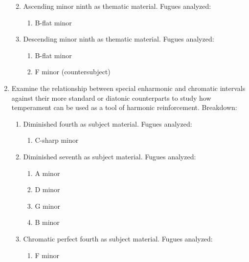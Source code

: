 \begin{enumerate}
  \begin{enumerate}
  \def\labelenumii{\arabic{enumii}.}
  \tightlist
  \item
    Ascending minor ninth as thematic material. Fugues analyzed:

    \begin{enumerate}
    \def\labelenumiii{\arabic{enumiii}.}
    \tightlist
    \item
      B-flat minor
    \end{enumerate}
  \item
    Descending minor ninth as thematic material. Fugues analyzed:

    \begin{enumerate}
    \def\labelenumiii{\arabic{enumiii}.}
    \tightlist
    \item
      B-flat minor
    \item
      F minor (countersubject)
    \end{enumerate}
  \end{enumerate}
\item
  Examine the relationship between special enharmonic and chromatic
  intervals against their more standard or diatonic counterparts to
  study how temperament can be used as a tool of harmonic reinforcement.
  Breakdown:

  \begin{enumerate}
  \def\labelenumii{\arabic{enumii}.}
  \tightlist
  \item
    Diminished fourth as subject material. Fugues analyzed:

    \begin{enumerate}
    \def\labelenumiii{\arabic{enumiii}.}
    \tightlist
    \item
      C-sharp minor
    \end{enumerate}
  \item
    Diminished seventh as subject material. Fugues analyzed:

    \begin{enumerate}
    \def\labelenumiii{\arabic{enumiii}.}
    \tightlist
    \item
      A minor
    \item
      D minor
    \item
      G minor
    \item
      B minor
    \end{enumerate}
  \item
    Chromatic perfect fourth as subject material. Fugues analyzed:

    \begin{enumerate}
    \def\labelenumiii{\arabic{enumiii}.}
    \tightlist
    \item
      F minor
    \end{enumerate}
  \end{enumerate}
\end{enumerate}

